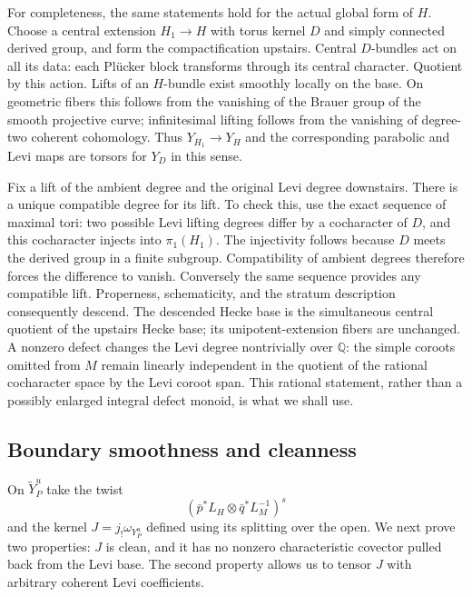 \documentclass[11pt]{article}
\numberwithin{equation}{section}
\theoremstyle{definition}
\theoremstyle{remark}
\begin{document}
For completeness, the same statements hold for the actual global form of
$H$.  Choose a central extension $H_1\to H$ with torus kernel $D$ and simply
connected derived group, and form the compactification upstairs.  Central
$D$-bundles act on all its data: each Pl\"ucker block transforms through its
central character.  Quotient by this action.  Lifts of an $H$-bundle exist
smoothly locally on the base.  On geometric fibers this follows from the
vanishing of the Brauer group of the smooth projective curve; infinitesimal
lifting follows from the vanishing of degree-two coherent cohomology.
Thus $Y_{H_1}\to Y_H$ and the corresponding parabolic and Levi maps are
torsors for $Y_D$ in this sense.

Fix a lift of the ambient degree and the original Levi degree downstairs.
There is a unique compatible degree for its lift.  To check this, use the
exact sequence of maximal tori: two possible Levi lifting degrees differ
by a cocharacter of $D$, and this cocharacter injects into $\pi_1(H_1)$.
The injectivity follows because $D$ meets the derived group in a finite
subgroup.  Compatibility of ambient degrees therefore forces the difference
to vanish.  Conversely the same sequence provides any compatible lift.
Properness, schematicity, and the stratum description consequently descend.
The descended Hecke base is the simultaneous central quotient of the
upstairs Hecke base; its unipotent-extension fibers are unchanged.  A
nonzero defect changes the Levi degree nontrivially over $\mathbb Q$: the
simple coroots omitted from $M$ remain linearly independent in the quotient
of the rational cocharacter space by the Levi coroot span.  This rational
statement, rather than a possibly enlarged integral defect monoid, is what
we shall use.

\subsection{Boundary smoothness and cleanness}

On $\widetilde Y_P^u$ take the twist
\[
 (\bar p^*L_H\otimes\bar q^*L_M^{-1})^s
\]
and the kernel $J=j_!\omega_{Y_P^u}$ defined using its splitting over the open.
We next prove two properties: $J$ is clean, and it has no nonzero
characteristic covector pulled back from the Levi base.  The second property
allows us to tensor $J$ with arbitrary coherent Levi coefficients.
\end{document}
